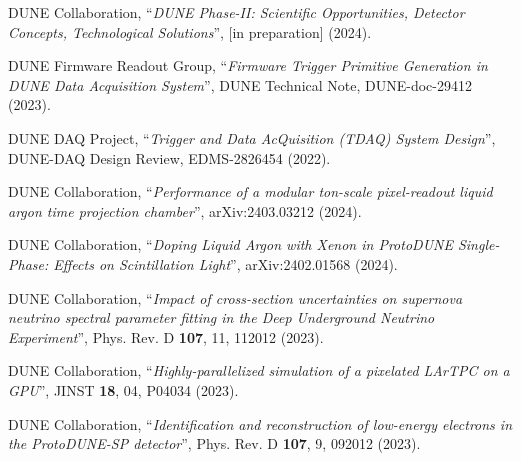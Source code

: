 \begin{list}{\scalebox{0.7}{$\square$}}{\leftmargin=1em \itemindent=0em}
	\item DUNE Collaboration, ``\textit{DUNE Phase-II: Scientific Opportunities, Detector Concepts, Technological Solutions}'', [in preparation] (2024).
	\item DUNE Firmware Readout Group, ``\textit{Firmware Trigger Primitive Generation in DUNE Data Acquisition System}'', DUNE Technical Note, DUNE-doc-29412 (2023).
	\item DUNE DAQ Project, ``\textit{Trigger and Data AcQuisition (TDAQ) System Design}'', DUNE-DAQ Design Review, EDMS-2826454 (2022). \newline
	\item DUNE Collaboration, ``\textit{Performance of a modular ton-scale pixel-readout liquid argon time projection chamber}'', arXiv:2403.03212 (2024).
	\item DUNE Collaboration, ``\textit{Doping Liquid Argon with Xenon in ProtoDUNE Single-Phase: Effects on Scintillation Light}'', arXiv:2402.01568 (2024).
	\item DUNE Collaboration, ``\textit{Impact of cross-section uncertainties on supernova neutrino spectral parameter fitting in the Deep Underground Neutrino Experiment}'', Phys. Rev. D \textbf{107}, 11, 112012 (2023).
	\item DUNE Collaboration, ``\textit{Highly-parallelized simulation of a pixelated LArTPC on a GPU}'', JINST \textbf{18}, 04, P04034 (2023).
	\item DUNE Collaboration, ``\textit{Identification and reconstruction of low-energy electrons in the ProtoDUNE-SP detector}'', Phys. Rev. D \textbf{107}, 9, 092012 (2023).
\end{list}


